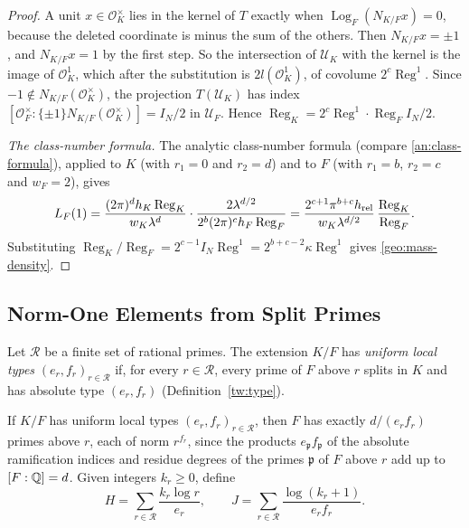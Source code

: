 \begin{proof}
A unit $x\in\mathcal O_K^\times$ lies in the kernel of $T$ exactly
when $\operatorname{Log}_F(N_{K/F}x)=0$, because the deleted coordinate
is minus the sum of the others. Then $N_{K/F}x=\pm1$, and $N_{K/F}x=1$
by the first step. So the intersection of $\mathcal U_K$ with the kernel is
the image of $\mathcal O_K^1$, which after the substitution is
$2l(\mathcal O_K^1)$, of covolume $2^c\operatorname{Reg}^1$. Since
$-1\notin N_{K/F}(\mathcal O_K^\times)$, the projection
$T(\mathcal U_K)$ has index
$[\mathcal O_F^\times:\{\pm1\}N_{K/F}(\mathcal O_K^\times)]=I_N/2$ in
$\mathcal U_F$. Hence
$\operatorname{Reg}_K=2^c\operatorname{Reg}^1\cdot\operatorname{Reg}_FI_N/2$.

\emph{The class-number formula.} The analytic class-number formula
\cite[Chapter~V, Theorem~2.4]{MilneCFT} (compare
\eqref{an:class-formula}), applied to $K$ (with $r_1=0$
and $r_2=d$) and to $F$ (with $r_1=b$, $r_2=c$ and $w_F=2$), gives
\[
 L_F(1)=\frac{(2\pi)^dh_K\operatorname{Reg}_K}{w_K\lambda^d}\cdot
 \frac{2\lambda^{d/2}}{2^b(2\pi)^ch_F\operatorname{Reg}_F}
 =\frac{2^{c+1}\pi^{b+c}h_{\rm rel}}{w_K\lambda^{d/2}}\,
 \frac{\operatorname{Reg}_K}{\operatorname{Reg}_F}.
\]
Substituting
$\operatorname{Reg}_K/\operatorname{Reg}_F=2^{c-1}I_N\operatorname{Reg}^1
=2^{b+c-2}\kappa\operatorname{Reg}^1$ gives \eqref{geo:mass-density}.
\end{proof}

\subsection{Norm-One Elements from Split Primes}

\begin{definition}\label{geo:uniform-types}
Let $\mathcal R$ be a finite set of rational primes. The extension $K/F$
has \emph{uniform local types} $(e_r,f_r)_{r\in\mathcal R}$ if, for every
$r\in\mathcal R$, every prime of $F$ above $r$ splits in $K$ and has
absolute type $(e_r,f_r)$ (Definition~\ref{tw:type}).
\end{definition}

If $K/F$ has uniform local types $(e_r,f_r)_{r\in\mathcal R}$, then $F$
has exactly $d/(e_rf_r)$ primes above $r$, each of norm $r^{f_r}$, since
the products $e_{\mathfrak p}f_{\mathfrak p}$ of the absolute ramification
indices and residue degrees of the primes $\mathfrak p$ of $F$ above $r$
add up to $[F:\mathbb Q]=d$. Given integers $k_r\ge0$, define
\begin{equation}\label{geo:HJ}
 H=\sum_{r\in\mathcal R}\frac{k_r\log r}{e_r},\qquad
 J=\sum_{r\in\mathcal R}\frac{\log(k_r+1)}{e_rf_r}.
\end{equation}

